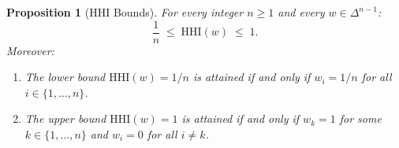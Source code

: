 \documentclass[12pt,openany]{book}
\newcommand{\bfw}{\mathbf{w}}
\numberwithin{equation}{chapter}
\theoremstyle{plain}
\newtheorem{proposition}[theorem]{Proposition}
\theoremstyle{definition}
\theoremstyle{remark}
\def\bfw{w}%
\begin{document}
\begin{proposition}[HHI Bounds]
\label{prop:hhi-bounds}
For every integer $n \geq 1$ and every
$\bfw \in \Delta^{n-1}$:
\begin{equation}
  \frac{1}{n}
  \;\leq\;
  \mathrm{HHI}(\bfw)
  \;\leq\;
  1.
  \label{eq:hhi-bounds}
\end{equation}
Moreover:
\begin{enumerate}
  \item The lower bound $\mathrm{HHI}(\bfw) = 1/n$ is attained
        if and only if $w_i = 1/n$ for all $i \in \{1,\ldots,n\}$.
  \item The upper bound $\mathrm{HHI}(\bfw) = 1$ is attained
        if and only if $w_k = 1$ for some $k \in \{1,\ldots,n\}$
        and $w_i = 0$ for all $i \neq k$.
\end{enumerate}
\end{proposition}
\end{document}

